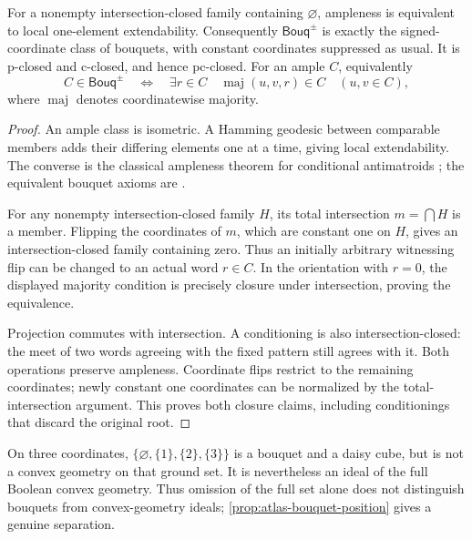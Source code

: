 \begin{proposition}
\label{prop:atlas-bouquet-characterization}
For a nonempty intersection-closed family containing $\varnothing$,
ampleness is equivalent to local one-element extendability. Consequently
$\mathsf{Bouq}^{\pm}$ is exactly the signed-coordinate class of bouquets,
with constant coordinates suppressed as usual. It is p-closed and c-closed,
and hence pc-closed. For an ample $C$, equivalently
\[
 C\in\mathsf{Bouq}^{\pm}
 \quad\Longleftrightarrow\quad
 \exists r\in C\quad
 \operatorname{maj}(u,v,r)\in C\quad(u,v\in C),
\]
where $\operatorname{maj}$ denotes coordinatewise majority.
\end{proposition}
\begin{proof}
An ample class is isometric. A Hamming geodesic between comparable members
adds their differing elements one at a time, giving local extendability.
The converse is the classical ampleness theorem for conditional antimatroids
\cite[\S3.2.4]{CCMW}; the equivalent bouquet axioms are
\cite[\S2.5]{CCKGeometry}.

For any nonempty intersection-closed family $H$, its total intersection
$m=\bigcap H$ is a member. Flipping the coordinates of $m$, which are
constant one on $H$, gives an intersection-closed family containing zero.
Thus an initially arbitrary witnessing flip can be changed to an actual
word $r\in C$. In the orientation with $r=0$, the displayed majority
condition is precisely closure under intersection, proving the equivalence.

Projection commutes with intersection. A conditioning is also
intersection-closed: the meet of two words agreeing with the fixed pattern
still agrees with it. Both operations preserve ampleness. Coordinate flips
restrict to the remaining coordinates; newly constant one coordinates can
be normalized by the total-intersection argument. This proves both closure
claims, including conditionings that discard the original root.
\end{proof}

\begin{example}
\label{ex:atlas-bouquet-star}
On three coordinates, $\{\varnothing,\{1\},\{2\},\{3\}\}$ is a bouquet
and a daisy cube, but is not a convex geometry on that ground set. It is
nevertheless an ideal of the full Boolean convex geometry. Thus omission
of the full set alone does not distinguish bouquets from convex-geometry
ideals; \cref{prop:atlas-bouquet-position} gives a genuine separation.
\end{example}

